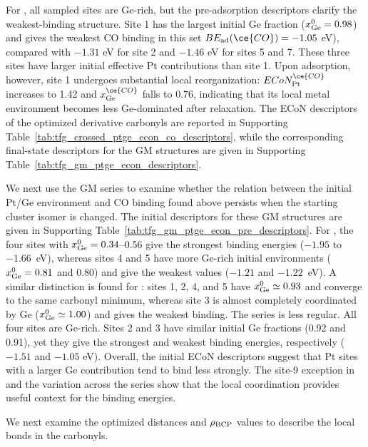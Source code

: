 For , all sampled sites are Ge-rich, but the pre-adsorption
descriptors clarify the weakest-binding structure. Site 1 has the largest
initial Ge fraction ($x_{\rm Ge}^{0}=0.98$) and gives the weakest CO binding
in this set 
$BE_{\rm ad}(\ce{CO})=-1.05$ eV), compared with
$-1.31$ eV for site 2 and
$-1.46$ eV for sites 5 and 7. These three sites
have larger initial effective Pt contributions than site 1. Upon adsorption,
however, site 1 undergoes substantial local reorganization:
$ECoN_{\rm Pt}^{\ce{CO}}$ increases to 1.42 and
$x_{\rm Ge}^{\ce{CO}}$ falls to 0.76, indicating that its local metal
environment becomes less Ge-dominated after relaxation. The ECoN descriptors of the optimized
derivative carbonyls are reported in Supporting
Table~\ref{tab:tfg_crossed_ptge_econ_co_descriptors}, while the corresponding
final-state descriptors for the GM structures are given in Supporting
Table~\ref{tab:tfg_gm_ptge_econ_descriptors}.

We next use the GM series to examine whether the relation between the
initial Pt/Ge environment and CO binding found above persists when the starting
cluster isomer is changed. The initial descriptors for these GM structures
are given in Supporting Table~\ref{tab:tfg_gm_ptge_econ_pre_descriptors}.
For , the four sites with
$x_{\rm Ge}^{0}=0.34$--0.56 give the strongest binding energies
($-1.95$ to $-1.66$~eV), whereas sites 4 and 5 have more Ge-rich initial
environments ($x_{\rm Ge}^{0}=0.81$ and 0.80) and give the weakest values
($-1.21$ and $-1.22$~eV). A similar distinction is found for :
sites 1, 2, 4, and 5
have $x_{\rm Ge}^{0}\simeq0.93$ and converge to the same carbonyl minimum,
whereas site 3 is almost completely coordinated by Ge
($x_{\rm Ge}^{0}\simeq1.00$) and gives the weakest binding. The 
series is less regular. All four sites are Ge-rich. Sites 2 and 3 have similar
initial Ge fractions (0.92 and 0.91), yet they give the strongest and weakest
binding energies, respectively ($-1.51$ and $-1.05$ eV).
Overall, the initial ECoN descriptors suggest that Pt sites with a
larger Ge contribution tend to bind  less strongly. The site-9
exception in  and the variation across the
 series show that the local coordination provides useful
context for the binding energies.




We next examine the optimized  distances and
$\rho_{\rm BCP}$ values to describe the local bonds in the carbonyls.

